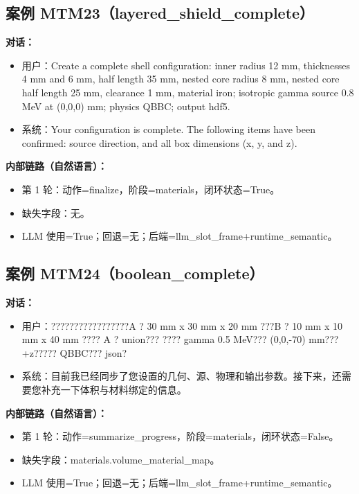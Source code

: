 \documentclass[11pt]{ctexart}
\begin{document}
\subsection{案例 MTM23（layered\_shield\_complete）}
\textbf{对话：}
\begin{itemize}
\item 用户：Create a complete shell configuration: inner radius 12 mm, thicknesses 4 mm and 6 mm, half length 35 mm, nested core radius 8 mm, nested core half length 25 mm, clearance 1 mm, material iron; isotropic gamma source 0.8 MeV at (0,0,0) mm; physics QBBC; output hdf5.
\item 系统：Your configuration is complete. The following items have been confirmed: source direction, and all box dimensions (x, y, and z).
\end{itemize}
\textbf{内部链路（自然语言）：}
\begin{itemize}
\item 第 1 轮：动作=finalize，阶段=materials，闭环状态=True。
\item 缺失字段：无。
\item LLM 使用=True；回退=无；后端=llm\_slot\_frame+runtime\_semantic。
\end{itemize}
\subsection{案例 MTM24（boolean\_complete）}
\textbf{对话：}
\begin{itemize}
\item 用户：?????????????????A ? 30 mm x 30 mm x 20 mm ???B ? 10 mm x 10 mm x 40 mm ???? A ? union??? ???? gamma 0.5 MeV??? (0,0,-70) mm??? +z????? QBBC??? json?
\item 系统：目前我已经同步了您设置的几何、源、物理和输出参数。接下来，还需要您补充一下体积与材料绑定的信息。
\end{itemize}
\textbf{内部链路（自然语言）：}
\begin{itemize}
\item 第 1 轮：动作=summarize\_progress，阶段=materials，闭环状态=False。
\item 缺失字段：materials.volume\_material\_map。
\item LLM 使用=True；回退=无；后端=llm\_slot\_frame+runtime\_semantic。
\end{itemize}
\end{document}
